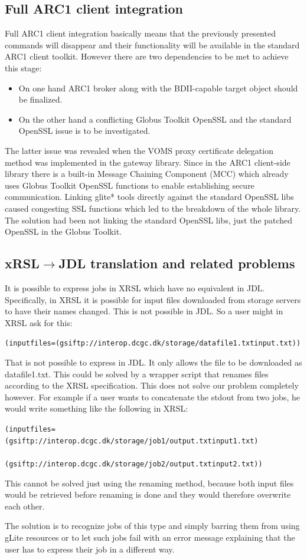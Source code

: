 \documentclass{article}
\begin{document}
\subsection{Full ARC1 client integration}
Full ARC1 client integration basically means that the previously presented commands will disappear and their functionality will be available in the standard ARC1 client toolkit. However there are two dependencies to be met to achieve this stage:
\begin{itemize}
\item On one hand ARC1 broker along with the BDII-capable target object should be finalized.
\item On the other hand a conflicting Globus Toolkit OpenSSL and the standard OpenSSL issue is to be investigated.
\end{itemize}
The latter issue was revealed when the VOMS proxy certificate delegation method was implemented in the gateway library. Since in the ARC1 client-side library there is a built-in Message Chaining Component (MCC) which already uses Globus Toolkit OpenSSL functions to enable establishing secure communication. Linking glite* tools directly against the standard OpenSSL libs caused congesting SSL functions which led to the breakdown of the whole library. The solution had been not linking the standard OpenSSL libs, just the patched OpenSSL in the Globus Toolkit.
\subsection{xRSL${\rightarrow}$JDL translation and related problems}
It is possible to express jobs in XRSL which have no equivalent in JDL. Speciﬁcally, in XRSL it is possible for input files downloaded from storage servers to have their names changed. This is not possible in JDL. So a user might in XRSL ask for this:
\begin{shaded}
\verb#(inputfiles=(gsiftp://interop.dcgc.dk/storage/datafile1.txtinput.txt))#
\end{shaded}
That is not possible to express in JDL. It only allows the file to be downloaded as datafile1.txt. This could be solved by a wrapper script that renames files according to the XRSL speciﬁcation. This does not solve our problem completely however. For example if a user wants to concatenate the stdout from two jobs, he would write something like the following in XRSL:
\begin{shaded}
\verb#(inputfiles=(gsiftp://interop.dcgc.dk/storage/job1/output.txtinput1.txt)#\\
\verb#            (gsiftp://interop.dcgc.dk/storage/job2/output.txtinput2.txt))#
\end{shaded}
This cannot be solved just using the renaming method, because both input files would be retrieved before renaming is done and they would therefore overwrite each other.\par
The solution is to recognize jobs of this type and simply barring them from using gLite resources or to let such jobs fail with an error message explaining that the user has to express their job in a different way.
\end{document}
